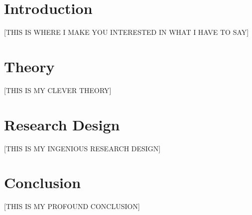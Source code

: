 \documentclass[11pt,article,oneside]{memoir}
\begin{document}
\section{Introduction}

\begin{center}
[THIS IS WHERE I MAKE YOU INTERESTED IN WHAT I HAVE TO SAY]
\end{center}


\section{Theory}

\begin{center}
[THIS IS MY CLEVER THEORY]
\end{center}


\section{Research Design}

\begin{center}
[THIS IS MY INGENIOUS RESEARCH DESIGN]
\end{center}


\section{Conclusion}

\begin{center}
[THIS IS MY PROFOUND CONCLUSION]
\end{center}



\printbibliography
\end{document}

